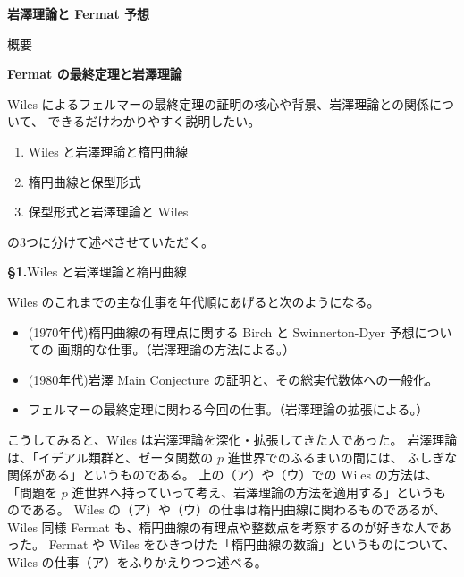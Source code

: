 \documentclass[uplatex,dvipdfmx]{jlreq}
\begin{document}
\begin{center}
  \vspace*{20pt}
  {\Huge\bfseries 岩澤理論と Fermat 予想}

  \vspace{1pc}
  {\Large 概要}
\end{center}

\vfill

\newpage

\noindent
{\large\bfseries Fermat の最終定理と岩澤理論}

\bigskip
\hspace*{\fill}{\large\bfseries 加藤　和也（東工大・理）}

\bigskip

Wiles によるフェルマーの最終定理の証明の核心や背景、岩澤理論との関係について、
できるだけわかりやすく説明したい。
\begin{enumerate}
  \item Wiles と岩澤理論と楕円曲線
  \item 楕円曲線と保型形式
  \item 保型形式と岩澤理論と Wiles
\end{enumerate}
の3つに分けて述べさせていただく。

\medskip
\noindent\textbf{\S1.}\quad Wiles と岩澤理論と楕円曲線

Wiles のこれまでの主な仕事を年代順にあげると次のようになる。
\begin{itemize}
  \item[(ア)] (1970年代)\quad 楕円曲線の有理点に関する Birch と Swinnerton-Dyer 予想についての
              画期的な仕事。（岩澤理論の方法による。）
  \item[(イ)] (1980年代)\quad 岩澤 Main Conjecture の証明と、その総実代数体への一般化。
  \item[(ウ)] フェルマーの最終定理に関わる今回の仕事。（岩澤理論の拡張による。）
\end{itemize}
こうしてみると、Wiles は岩澤理論を深化・拡張してきた人であった。
岩澤理論は、「イデアル類群と、ゼータ関数の $p$ 進世界でのふるまいの間には、
ふしぎな関係がある」というものである。
上の（ア）や（ウ）での Wiles の方法は、
「問題を $p$ 進世界へ持っていって考え、岩澤理論の方法を適用する」というものである。
Wiles の（ア）や（ウ）の仕事は楕円曲線に関わるものであるが、
Wiles 同様 Fermat も、楕円曲線の有理点や整数点を考察するのが好きな人であった。
Fermat や Wiles をひきつけた「楕円曲線の数論」というものについて、
Wiles の仕事（ア）をふりかえりつつ述べる。
\end{document}
